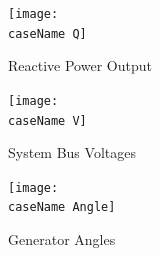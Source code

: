 \documentclass[12pt]{article}
\begin{document}
\pagebreak

	\begin{figure}[h!]
			\centering
			\texttt{[image: \\caseName Q]}\vspace{-.5em}
			\caption{Reactive Power Output}
			\label{\caseName Q}		 
	\end{figure}%

	\begin{figure}[h!]
			\centering
			\texttt{[image: \\caseName V]}\vspace{-.5em}
			\caption{System Bus Voltages}
			\label{\caseName V}		 
	\end{figure}%
	\begin{figure}[h!]
			\centering
			\texttt{[image: \\caseName Angle]}\vspace{-.5em}
			\caption{Generator Angles}
			\label{\caseName Angle}		 
	\end{figure}%
\end{document}
